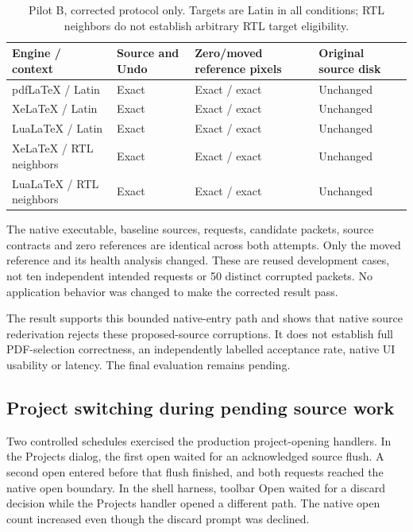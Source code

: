 \begin{table}[htbp]
\small\begin{tabularx}{\linewidth}{@{}>{\raggedright\arraybackslash}p{.21\linewidth}YYY@{}}
\toprule
Engine / context & Source and Undo & Zero/moved reference pixels & Original source disk\\
\midrule
pdfLaTeX / Latin & Exact & Exact / exact & Unchanged\\
XeLaTeX / Latin & Exact & Exact / exact & Unchanged\\
LuaLaTeX / Latin & Exact & Exact / exact & Unchanged\\
XeLaTeX / RTL neighbors & Exact & Exact / exact & Unchanged\\
LuaLaTeX / RTL neighbors & Exact & Exact / exact & Unchanged\\
\bottomrule
\end{tabularx}
\caption{Pilot B, corrected protocol only. Targets are Latin in all conditions;
RTL neighbors do not establish arbitrary RTL target eligibility.}
\label{tab:native-results}
\end{table}

The native executable, baseline sources, requests, candidate packets, source
contracts and zero references are identical across both attempts. Only the
moved reference and its health analysis changed. These are reused development
cases, not ten independent intended requests or 50 distinct corrupted packets.
No application behavior was changed to make the corrected result pass.

The result supports this bounded native-entry path and shows that native source
rederivation rejects these proposed-source corruptions. It does not establish
full PDF-selection correctness, an independently labelled acceptance rate,
native UI usability or latency. The final evaluation remains pending.

\subsection{Project switching during pending source work}
\label{sec:project-switching}
Two controlled schedules exercised the production project-opening handlers.
In the Projects dialog, the first open waited for an acknowledged source
flush. A second open entered before that flush finished, and both requests
reached the native open boundary. In the shell harness, toolbar Open waited
for a discard decision while the Projects handler opened a different path.
The native open count increased even though the discard prompt was declined.

